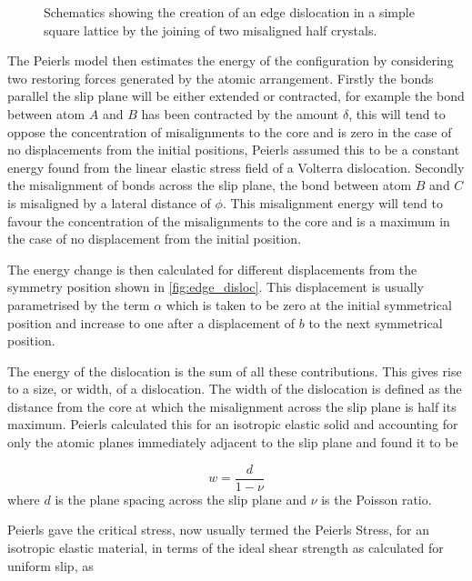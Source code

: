 \begin{figure}
    \caption{Schematics showing the creation of an edge dislocation in a simple square lattice by the joining of two misaligned half crystals. \label{fig:edge_disloc}}
\end{figure}



The Peierls model then estimates the energy of the configuration by considering two restoring forces generated by the atomic arrangement. Firstly the bonds parallel the slip plane will be either extended or contracted, for example the bond between atom $A$ and $B$ has been contracted by the amount $\delta$, this will tend to oppose the concentration of misalignments to the core and  is zero in the case of no displacements from the initial positions, Peierls assumed this to be a constant energy found from the linear elastic stress field of a Volterra dislocation. Secondly the misalignment of bonds across the slip plane, the bond between atom $B$ and $C$ is misaligned by a lateral distance of $\phi$. This misalignment energy will tend to favour the concentration of the misalignments to the core and is a maximum in the case of no displacement from the initial position.

The energy change is then calculated for different displacements from the symmetry position shown in \autoref{fig:edge_disloc}. This displacement is usually parametrised by the term $\alpha$ which is taken to be zero at the initial symmetrical position and increase to one after a displacement of $b$ to the next symmetrical position. 






The energy of the dislocation is the sum of all these contributions. This gives rise to a size, or width, of a dislocation. The width of the dislocation is defined as the distance from the core at which the misalignment across the slip plane is half its maximum. Peierls calculated this for an isotropic elastic solid and accounting for only the atomic planes immediately adjacent to the slip plane and found it to be 

\begin{equation}
w = \frac{d}{1-\nu}
\label{eqn:width_isotropic}
\end{equation}
where $d$ is the plane spacing across the slip plane and $\nu$ is the Poisson ratio.


Peierls gave the critical stress, now usually termed the Peierls Stress, for an isotropic elastic material, in terms of the ideal shear strength as calculated for uniform slip, as


